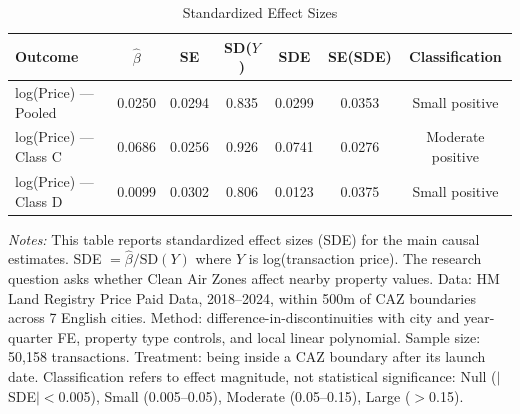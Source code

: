 \begin{table}[htbp]
\centering
\caption{Standardized Effect Sizes}
\label{tab:sde}
\begin{tabular}{lcccccc}
\hline\hline
Outcome & $\hat{\beta}$ & SE & SD($Y$) & SDE & SE(SDE) & Classification \\
\hline
log(Price) --- Pooled & 0.0250 & 0.0294 & 0.835 & 0.0299 & 0.0353 & Small positive \\
log(Price) --- Class C & 0.0686 & 0.0256 & 0.926 & 0.0741 & 0.0276 & Moderate positive \\
log(Price) --- Class D & 0.0099 & 0.0302 & 0.806 & 0.0123 & 0.0375 & Small positive \\
\hline
\end{tabular}

\vspace{0.5em}
\begin{minipage}{0.95\textwidth}
\footnotesize
\textit{Notes:} This table reports standardized effect sizes (SDE) for the main causal estimates. SDE $= \hat{\beta} / \text{SD}(Y)$ where $Y$ is log(transaction price). The research question asks whether Clean Air Zones affect nearby property values. Data: HM Land Registry Price Paid Data, 2018--2024, within 500m of CAZ boundaries across 7 English cities. Method: difference-in-discontinuities with city and year-quarter FE, property type controls, and local linear polynomial. Sample size: 50,158 transactions. Treatment: being inside a CAZ boundary after its launch date. Classification refers to effect magnitude, not statistical significance: Null ($|$SDE$|<$0.005), Small (0.005--0.05), Moderate (0.05--0.15), Large ($>$0.15).
\end{minipage}
\end{table}
